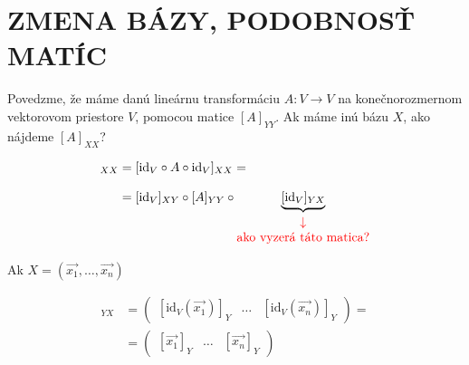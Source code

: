 \documentclass[11pt,a4paper]{article}
\theoremstyle{definition}
\theoremstyle{plain}
\theoremstyle{remark}
\newcommand{\id}{\mathrm{id}}
\newcommand{\R}{\mathbb{R}}
\newcommand{\ora}[1]{\overrightarrow{#1}}
\begin{document}
\vspace{0.5cm}
\begin{center}
\end{center}
\vspace{0.5cm}

\section*{ZMENA BÁZY, PODOBNOSŤ MATÍC}

Povedzme, že máme danú lineárnu transformáciu $A \colon V \to V$ na konečnorozmernom vektorovom priestore $V$, pomocou matice $[A]_{YY}$. Ak máme inú bázu $X$, ako nájdeme $[A]_{XX}$?

\begin{align*}
[A]_{XX} &= [\id_V \circ A \circ \id_V]_{XX} = \\[0.3cm]
&= [\id_V]_{XY} \circ [A]_{YY} \circ \underbrace{[\id_V]_{YX}}_{\color{red}\begin{matrix} \downarrow \\ \text{ako vyzerá táto matica?} \end{matrix}}
\end{align*}

Ak $X = (\ora{x_1}, \dots, \ora{x_n})$

\begin{align*}
[\id_V]_{YX} &= \begin{pmatrix} 
[\id_V(\ora{x_1})]_Y & \dots & [\id_V(\ora{x_n})]_Y 
\end{pmatrix} = \\[0.3cm]
&= \begin{pmatrix} 
[\ora{x_1}]_Y & \dots & [\ora{x_n}]_Y 
\end{pmatrix}
\end{align*}
\end{document}
